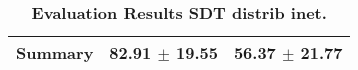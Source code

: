 \begin{table}[htb]
{\begin{tabular}{lll}
\midrule
\textbf{Summary                                  } &                  \phantom{0}82.91 $\pm$ 19.55 &                      \phantom{0}56.37 $\pm$ 21.77 \\
\bottomrule
\end{tabular}%
}
\caption{\textbf{Evaluation Results SDT distrib inet.}}
\label{tab:eval-results}
\end{table}
